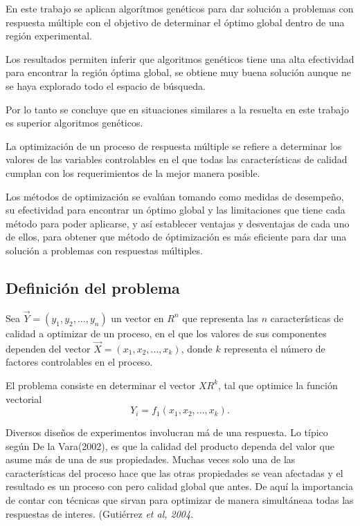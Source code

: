 En este trabajo se aplican algor\'itmos gen\'eticos para dar soluci\'on a 
problemas con respuesta m\'ultiple con el objetivo de determinar el \'optimo
global dentro de una regi\'on experimental. 

Los resultados permiten inferir que algoritmos gen\'eticos tiene una alta 
efectividad para encontrar la regi\'on \'optima global, se obtiene muy buena 
soluci\'on aunque ne se haya explorado todo el espacio de b\'usqueda.

Por lo tanto se concluye que en situaciones similares a la resuelta en este 
trabajo es superior algoritmos gen\'eticos.

La optimizaci\'on de un proceso de respuesta m\'ultiple se refiere a determinar
los valores de las variables controlables en el que todas las caracter\'isticas
de calidad cumplan con los requerimientos de la mejor manera posible.

Los m\'etodos de optimizaci\'on se eval\'uan tomando como medidas de 
desempe\~no, su efectividad para encontrar un \'optimo global y las limitaciones
que tiene cada m\'etodo para poder aplicarse, y as\'i establecer ventajas y 
desventajas de cada uno de ellos, para obtener que m\'etodo de \'optimizaci\'on
es m\'as eficiente para dar una soluci\'on a problemas con respuestas 
m\'ultiples.

\subsection{Definici\'on del problema}
Sea $\vec Y=(y_1,y_2,...,y_n)$ un vector en $R^n$ que representa las $n$ 
caracter\'isticas de calidad a optimizar de un proceso, en el que los valores de
sus componentes dependen del vector $\vec X=(x_1,x_2,...,x_k)$, donde $k$ 
representa el n\'umero de factores controlables en el proceso.

El problema consiste en determinar el vector $XR^k$, tal que optimice la 
funci\'on vectorial
$$Y_i=f_1(x_1,x_2,...,x_k).$$

Diversos dise\~nos de experimentos involucran m\'a de una respuesta. Lo t\'ipico
seg\'un De la Vara(2002), es que la calidad del producto dependa del valor que
asume m\'as de una de sus propiedades. Muchas veces solo una de las 
caracter\'isticas del proceso hace que las otras propiedades se vean afectadas
y el resultado es un proceso con pero calidad global que antes. De aqu\'i la 
importancia de contar con t\'ecnicas que sirvan para optimizar de manera
simult\'aneaa todas las respuestas de interes. (Guti\'errez {\it et al, 2004}.

